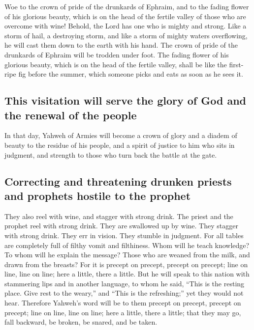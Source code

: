  Woe to the crown of pride of the drunkards of Ephraim,
and to the fading flower of his glorious beauty, which is on the head of
the fertile valley of those who are overcome with wine! 
Behold, the Lord has one who is mighty and strong. Like a storm of hail,
a destroying storm, and like a storm of mighty waters overflowing, he
will cast them down to the earth with his hand.  The crown
of pride of the drunkards of Ephraim will be trodden under foot.
 The fading flower of his glorious beauty, which is on the
head of the fertile valley, shall be like the first-ripe fig before the
summer, which someone picks and eats as soon as he sees it.

\hypertarget{this-visitation-will-serve-the-glory-of-god-and-the-renewal-of-the-people}{%
\subsection{This visitation will serve the glory of God and the renewal
of the
people}\label{this-visitation-will-serve-the-glory-of-god-and-the-renewal-of-the-people}}

 In that day, Yahweh of Armies will become a crown of
glory and a diadem of beauty to the residue of his people,
 and a spirit of justice to him who sits in judgment, and
strength to those who turn back the battle at the gate.

\hypertarget{correcting-and-threatening-drunken-priests-and-prophets-hostile-to-the-prophet}{%
\subsection{Correcting and threatening drunken priests and prophets
hostile to the
prophet}\label{correcting-and-threatening-drunken-priests-and-prophets-hostile-to-the-prophet}}

 They also reel with wine, and stagger with strong drink.
The priest and the prophet reel with strong drink. They are swallowed up
by wine. They stagger with strong drink. They err in vision. They
stumble in judgment.  For all tables are completely full
of filthy vomit and filthiness.  Whom will he teach
knowledge? To whom will he explain the message? Those who are weaned
from the milk, and drawn from the breasts?  For it is
precept on precept, precept on precept; line on line, line on line; here
a little, there a little.  But he will speak to this
nation with stammering lips and in another language,  to
whom he said, ``This is the resting place. Give rest to the weary,'' and
``This is the refreshing;'' yet they would not hear. 
Therefore Yahweh's word will be to them precept on precept, precept on
precept; line on line, line on line; here a little, there a little; that
they may go, fall backward, be broken, be snared, and be taken.

